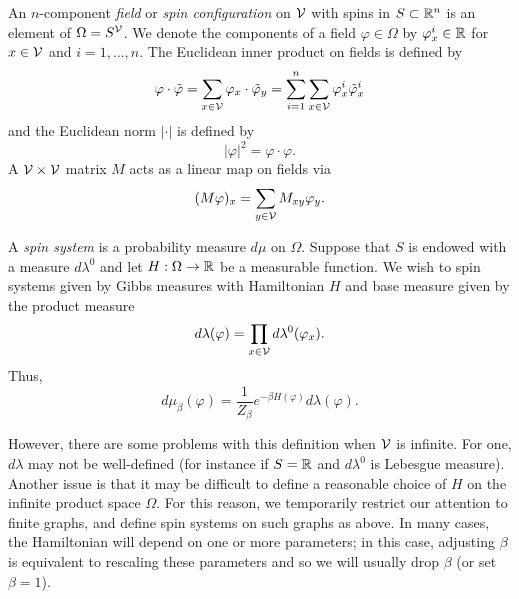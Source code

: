 An $n$-component \emph{field} or \emph{spin configuration} on $\mathcal{V}$
with spins in $S \subset {\mathbb R}^n$ is an element of $\Omega = S^{\mathcal{V}}$. We denote the components of a field $\varphi \in \Omega$ by $\varphi^i_x \in {\mathbb R}$ for $x \in \mathcal{V}$ and $i = 1, \ldots, n$. The Euclidean inner product on fields is defined by
\begin{equation}
\varphi\cdot\tilde\varphi
  =
\sum_{x\in\mathcal{V}} \varphi_x \cdot \tilde\varphi_y
  =
\sum_{i=1}^n \sum_{x\in\mathcal{V}} \varphi^i_x \tilde\varphi^i_x
\end{equation}
and the Euclidean norm $|\cdot|$ is defined by
\begin{equation}
|\varphi|^2 = \varphi \cdot \varphi.
\end{equation}
A $\mathcal{V}\times\mathcal{V}$ matrix $M$ acts as a linear map on fields via
\begin{equation}
(M \varphi)_x = \sum_{y\in\mathcal{V}} M_{xy} \varphi_y.
\end{equation}

A \emph{spin system} is a probability measure $d\mu$ on $\Omega$.
Suppose that $S$ is endowed with a measure $d\lambda^0$ and let
$H : \Omega \rightarrow {\mathbb R}$ be a measurable function. We wish to spin systems given by Gibbs measures with Hamiltonian $H$ and base measure given by the product measure
\begin{equation}
d\lambda(\varphi) = \prod_{x\in\mathcal{V}} d\lambda^0(\varphi_x).
\end{equation}
Thus,
\begin{equation}
d\mu_\beta(\varphi)
  =
\frac{1}{Z_\beta} e^{-\beta H(\varphi)} d\lambda(\varphi).
\end{equation}

However, there are some problems with this definition when $\mathcal{V}$ is infinite. For one, $d\lambda$ may not be well-defined (for instance if
$S = {\mathbb R}$ and $d\lambda^0$ is Lebesgue measure). Another issue is that it may be difficult to define a reasonable choice of $H$ on the infinite product space
$\Omega$. For this reason, we temporarily restrict our attention to finite graphs, and define spin systems on such graphs as above. In many cases, the Hamiltonian will depend on one or more parameters; in this case, adjusting $\beta$ is equivalent to rescaling these parameters and so we will usually drop $\beta$
(or set $\beta = 1$).


